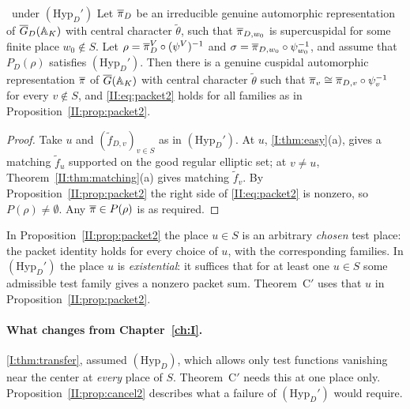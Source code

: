 \begin{theorem}[Theorem~C$'$]\label{II:thm:Cprime}\ under $(\mathrm{Hyp}_D')$
Let $\overline{\pi}_D$ be an irreducible genuine automorphic representation of $\overline{G}_D(\mathbb{A}_K)$ with central character $\tilde\theta$, such that $\overline{\pi}_{D,w_0}$ is supercuspidal for some finite place $w_0\notin S$. Let $\rho=\overline{\pi}_D^V\circ(\psi^V)^{-1}$ and $\sigma=\overline{\pi}_{D,w_0}\circ\psi_{w_0}^{-1}$, and assume that $P_D(\rho)$ satisfies $(\mathrm{Hyp}_D')$. Then there is a genuine cuspidal automorphic representation $\overline{\pi}$ of $\overline{G}(\mathbb{A}_K)$ with central character $\tilde\theta$ such that $\overline{\pi}_v\cong\overline{\pi}_{D,v}\circ\psi_v^{-1}$ for every $v\notin S$, and \eqref{II:eq:packet2} holds for all families as in Proposition~\ref{II:prop:packet2}.
\end{theorem}
\begin{proof}
Take $u$ and $(\tilde f_{D,v})_{v\in S}$ as in $(\mathrm{Hyp}_D')$. At $u$, \cref{I:thm:easy}(a), gives a matching $\tilde f_u$ supported on the good regular elliptic set; at $v\ne u$, Theorem~\ref{II:thm:matching}(a) gives matching $\tilde f_v$. By Proposition~\ref{II:prop:packet2} the right side of \eqref{II:eq:packet2} is nonzero, so $P(\rho)\ne\emptyset$. Any $\overline{\pi}\in P(\rho)$ is as required.
\end{proof}

\begin{remark}
In Proposition~\ref{II:prop:packet2} the place $u\in S$ is an arbitrary \emph{chosen} test place: the packet identity holds for every choice of $u$, with the corresponding families. In $(\mathrm{Hyp}_D')$ the place $u$ is \emph{existential}: it suffices that for at least one $u\in S$ some admissible test family gives a nonzero packet sum. Theorem~C$'$ uses that $u$ in Proposition~\ref{II:prop:packet2}.
\end{remark}

\paragraph{What changes from Chapter~\ref{ch:I}.} \cref{I:thm:transfer}, assumed $(\mathrm{Hyp}_D)$, which allows only test functions vanishing near the center at \emph{every} place of $S$. Theorem~C$'$ needs this at one place only. Proposition~\ref{II:prop:cancel2} describes what a failure of $(\mathrm{Hyp}_D')$ would require.

